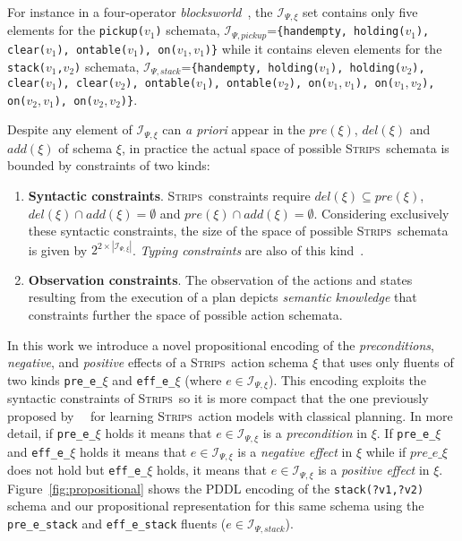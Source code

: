 \documentclass{article}
\newcommand{\strips}{\textsc{Strips}}
\begin{document}
For instance in a four-operator {\em blocksworld}~\cite{slaney2001blocks}, the ${\mathcal I}_{\Psi,\xi}$ set contains only five elements for the {\small \tt pickup($v_1$)} schemata, ${\mathcal I}_{\Psi,pickup}$={\small\tt\{handempty, holding($v_1$), clear($v_1$), ontable($v_1$), on($v_1,v_1$)\}} while it contains eleven elements for the {\small \tt stack($v_1$,$v_2$)} schemata, ${\mathcal I}_{\Psi,stack}$={\small\tt\{handempty, holding($v_1$), holding($v_2$), clear($v_1$), clear($v_2$), ontable($v_1$), ontable($v_2$), on($v_1,v_1$), on($v_1,v_2$), on($v_2,v_1$), on($v_2,v_2$)\}}. 

Despite any element of ${\mathcal I}_{\Psi,\xi}$ can {\em a priori} appear in the $pre(\xi)$, $del(\xi)$ and $add(\xi)$ of schema $\xi$, in practice the actual space of possible \strips\ schemata is bounded by constraints of two kinds:
\begin{enumerate}
\item {\bf Syntactic constraints}. \strips\ constraints require $del(\xi)\subseteq pre(\xi)$, $del(\xi)\cap add(\xi)=\emptyset$ and $pre(\xi)\cap add(\xi)=\emptyset$. Considering exclusively these syntactic constraints, the size of the space of possible \strips\ schemata is given by $2^{2\times|{\mathcal I}_{\Psi,\xi}|}$. {\em Typing constraints} are also of this kind~\cite{mcdermott1998pddl}. 
\item {\bf Observation constraints}. The observation of the actions and states resulting from the execution of a plan depicts {\em semantic knowledge} that constraints further the space of possible action schemata.   
\end{enumerate}

In this work we introduce a novel propositional encoding of the {\em preconditions}, {\em negative}, and {\em positive} effects of a \strips\ action schema $\xi$ that uses only fluents of two kinds {\tt\small pre\_e\_$\xi$} and {\tt\small eff\_e\_$\xi$} (where $e\in{\mathcal I}_{\Psi,\xi}$). This encoding exploits the syntactic constraints of \strips\, so it is more compact that the one previously proposed by~\citeauthor{aineto2018learning}~\citeyear{aineto2018learning} for learning \strips\ action models with classical planning. In more detail, if {\tt\small pre\_e\_$\xi$} holds it means that $e\in{\mathcal I}_{\Psi,\xi}$ is a {\em precondition} in $\xi$. If {\tt\small pre\_e\_$\xi$} and {\tt\small eff\_e\_$\xi$} holds it means that $e\in{\mathcal I}_{\Psi,\xi}$ is a {\em negative effect} in $\xi$ while if $pre\_e\_\xi$ does not hold but {\tt\small eff\_e\_$\xi$} holds, it means that $e\in{\mathcal I}_{\Psi,\xi}$ is a {\em positive effect} in $\xi$. Figure~\ref{fig:propositional} shows the PDDL encoding of the {\tt\small stack(?v1,?v2)} schema and our propositional representation for this same schema using the {\tt\small pre\_e\_stack} and {\tt\small eff\_e\_stack} fluents ($e\in{\mathcal I}_{\Psi,stack}$).
\end{document}
